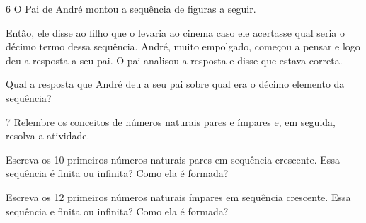 

\num{6} O Pai de André montou a sequência de figuras a seguir.


Então, ele disse ao filho que o levaria ao cinema caso ele acertasse
qual seria o décimo termo dessa sequência. André, muito empolgado, começou a
pensar e logo deu a resposta a seu pai. O pai analisou a resposta e
disse que estava correta.

Qual a resposta que André deu a seu pai sobre qual era o décimo elemento da sequência?



\num{7} Relembre os conceitos de números naturais pares e ímpares e, em
seguida, resolva a atividade.

\begin{escolha}
\item
  Escreva os 10 primeiros números naturais pares em sequência crescente.
  Essa sequência é finita ou infinita? Como ela é formada?



\item
  Escreva os 12 primeiros números naturais ímpares em sequência
  crescente. Essa sequência e finita ou infinita? Como ela é formada?


\end{escolha}

